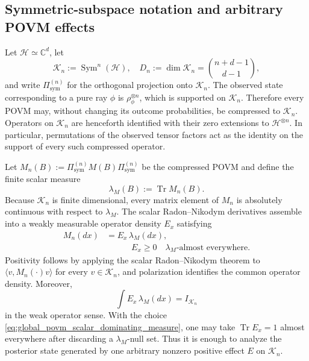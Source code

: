 \documentclass[journal]{IEEEtran}
\begin{document}
\subsection{Symmetric-subspace notation and arbitrary POVM effects}
\label{subsec:global_symmetric_power_notation}
Let \(\mathcal H\simeq\mathbb C^d\), let
\[
    \mathcal K_n:=\operatorname{Sym}^n(\mathcal H),
    \quad
    D_n:=\dim\mathcal K_n=\binom{n+d-1}{d-1},
\]
and write \(\Pi_{\mathrm{sym}}^{(n)}\) for the orthogonal projection onto
\(\mathcal K_n\).  The observed state corresponding to a pure ray \(\phi\) is
\(\rho_\phi^{\otimes n}\), which is supported on \(\mathcal K_n\).
Therefore every POVM may, without changing its outcome probabilities, be
compressed to \(\mathcal K_n\).
Operators on \(\mathcal K_n\) are henceforth identified with their zero
extensions to \(\mathcal H^{\otimes n}\).  In particular, permutations of
the observed tensor factors act as the identity on the support of every
such compressed operator.

Let \(M_n(B):=\Pi_{\mathrm{sym}}^{(n)}M(B)\Pi_{\mathrm{sym}}^{(n)}\) be the
compressed POVM and define the finite scalar measure
\begin{equation}
    \lambda_M(B):=\operatorname{Tr}M_n(B).
    \label{eq:global_povm_scalar_dominating_measure}
\end{equation}
Because \(\mathcal K_n\) is finite dimensional, every matrix element of
\(M_n\) is absolutely continuous with respect to \(\lambda_M\).  The scalar
Radon--Nikodym derivatives assemble into a weakly measurable operator density
\(E_x\) satisfying
\begin{align}
    M_n(dx)&=E_x\,\lambda_M(dx),\nonumber\\
    &\quad\qquad E_x\ge0
    \quad \lambda_M\text{-almost everywhere}.
    \label{eq:global_povm_radon_nikodym_density}
\end{align}
Positivity follows by applying the scalar Radon--Nikodym theorem to
\(\langle v,M_n(\cdot)v\rangle\) for every \(v\in\mathcal K_n\), and
polarization identifies the common operator density.  Moreover,
\begin{equation}
    \int E_x\,\lambda_M(dx)=I_{\mathcal K_n}
    \label{eq:global_povm_density_weak_normalization}
\end{equation}
in the weak operator sense.  With the choice
\eqref{eq:global_povm_scalar_dominating_measure}, one may take
\(\operatorname{Tr}E_x=1\) almost everywhere after discarding a
\(\lambda_M\)-null set.  Thus it is enough to analyze the posterior state
generated by one arbitrary nonzero positive effect \(E\) on
\(\mathcal K_n\).
\end{document}
